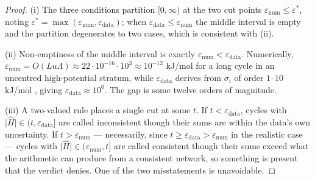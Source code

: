 \documentclass[11pt,twocolumn,a4paper]{article}
\theoremstyle{pstyle}
\theoremstyle{definition}
\theoremstyle{remark}
\newcommand{\abs}[1]{\lvert#1\rvert}
\newcommand{\eps}{\varepsilon}
\newcommand{\epsnum}{\eps_{\mathrm{num}}}
\newcommand{\epsdata}{\eps_{\mathrm{data}}}
\newcommand{\epsstar}{\eps^{\ast}}
\newcommand{\hol}{H}
\newcommand{\mach}{u}
\begin{document}
\begin{proof}
(i) The three conditions partition $[0,\infty)$ at the two cut points
$\epsnum \le \epsstar$, noting $\epsstar = \max(\epsnum,\epsdata)$; when
$\epsdata \le \epsnum$ the middle interval is empty and the partition
degenerates to two cases, which is consistent with (ii).

(ii) Non-emptiness of the middle interval is exactly
$\epsnum < \epsdata$. Numerically, $\epsnum = O(L\mach\Lambda) \approx
22 \cdot 10^{-16}\cdot 10^{3} \approx 10^{-12}$ kJ/mol for a long cycle
in an uncentred high-potential stratum, while $\epsdata$ derives from
$\sigma_i$ of order $1$--$10$ kJ/mol \citep{noor2013,flamholz2012},
giving $\epsdata \approx 10^{0}$. The gap is some twelve orders of
magnitude.

(iii) A two-valued rule places a single cut at some $t$. If
$t<\epsdata$, cycles with $\abs{\widehat{\hol}}\in(t,\epsdata]$ are
called inconsistent though their sums are within the data's own
uncertainty. If $t>\epsnum$ --- necessarily, since $t\ge\epsdata>
\epsnum$ in the realistic case --- cycles with
$\abs{\widehat{\hol}}\in(\epsnum,t]$ are called consistent though their
sums exceed what the arithmetic can produce from a consistent network,
so something is present that the verdict denies. One of the two
misstatements is unavoidable.
\end{proof}
\end{document}
